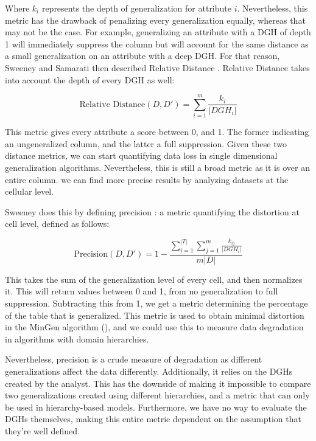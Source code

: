 Where $k_i$ represents the depth of generalization for attribute $i$. Nevertheless, this metric has the drawback of penalizing every generalization equally, whereas that may not be the case. For example, generalizing an attribute with a DGH of depth 1 will immediately suppress the column but will account for the same distance as a small generalization on an attribute with a deep DGH. 
For that reason, Sweeney and Samarati then described Relative Distance \cite{kanon_algos}. Relative Distance takes into account the depth of every DGH as well:

$$
    \mbox{Relative Distance}(D, D') = \sum_{i=1}^m \frac{k_i}{|DGH_i|}
    \label{rel_dist}
$$

This metric gives every attribute a score between 0, and 1. The former indicating an ungeneralized column, and the latter a full suppression. Given these two distance metrics, we can start quantifying data loss in single dimensional generalization algorithms. Nevertheless, this is still a broad metric as it is over an entire column. we can find more precise results by analyzing datasets at the cellular level.

Sweeney does this by defining precision \cite{kanon_algos}: a metric quantifying the distortion at cell level, defined as follows:

$$
    \mbox{Precision}(D, D') = 1 - \frac{\sum\limits_{i=1}^{|T|} \sum\limits_{j=1}^m \displaystyle\frac{k_{ij}}{|DGH_{i}|}} {m|D|}
    \label{precision}
$$

This takes the sum of the generalization level of every cell, and then normalizes it. This will return values between 0 and 1, from no generalization to full suppression. Subtracting this from 1, we get a metric determining the percentage of the table that is generalized. This metric is used to obtain minimal distortion in the MinGen algorithm (), and we could use this to measure data degradation in algorithms with domain hierarchies.

Nevertheless, precision is a crude measure of degradation as different generalizations affect the data differently. Additionally, it relies on the DGHs created by the analyst. This has the downside of making it impossible to compare two generalizations created using different hierarchies, and a metric that can only be used in hierarchy-based models. Furthermore, we have no way to evaluate the DGHs themselves, making this entire metric dependent on the assumption that they're well defined.

